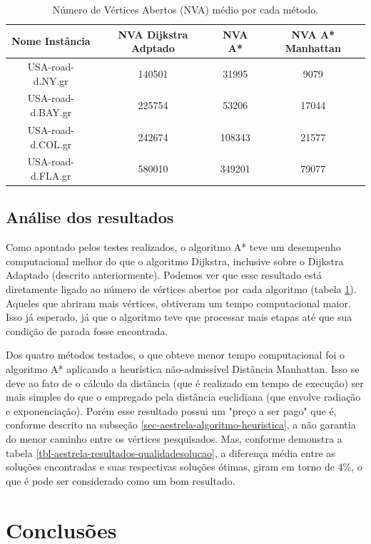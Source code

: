 \begin{table}[H]
\caption{Número de Vértices Abertos (NVA) médio por cada método.}
\label{tbl-aestrela-resultados-nva}
\centering
\begin{adjustbox}{max width=\textwidth}
\begin{tabular}{|c|c|c|c|}
\hline
\textbf{Nome Instância} & \textbf{NVA Dijkstra Adptado} & \textbf{NVA A*} & \textbf{NVA A* Manhattan} \\ \hline
USA-road-d.NY.gr        & 140501                        & 31995           & 9079                      \\ \hline
USA-road-d.BAY.gr       & 225754                        & 53206           & 17044                     \\ \hline
USA-road-d.COL.gr       & 242674                        & 108343          & 21577                     \\ \hline
USA-road-d.FLA.gr       & 580010                        & 349201          & 79077                     \\ \hline
\end{tabular} 
\end{adjustbox}
\end{table}

\subsection{Análise dos resultados}
\label{sec-aestrela-resultados-analise}
Como apontado pelos testes realizados, o algoritmo A* teve um desempenho computacional melhor do que o algoritmo Dijkstra, inclusive sobre o Dijkstra Adaptado (descrito anteriormente). Podemos ver que esse resultado está diretamente ligado ao número de vértices abertos por cada algoritmo (tabela \ref{tbl-aestrela-resultados-nva}). Aqueles que abriram mais vértices, obtiveram um tempo computacional maior. Isso já esperado, já que o algoritmo teve que processar mais etapas até que sua condição de parada fosse encontrada.

Dos quatro métodos testados, o que obteve menor tempo computacional foi o algoritmo A* aplicando a heurística não-admissível Distância Manhattan. Isso se deve ao fato de o cálculo da distância (que é realizado em tempo de execução) ser mais simples do que o empregado pela distância euclidiana (que envolve radiação e exponenciação). Porém esse resultado possui um "preço a ser pago" que é, conforme descrito na subseção \ref{sec-aestrela-algoritmo-heuristica}, a não garantia do menor caminho entre os vértices pesquisados. Mas, conforme demonstra a tabela \ref{tbl-aestrela-resultados-qualidadesolucao}, a diferença média entre as soluções encontradas e suas respectivas soluções ótimas, giram em torno de 4\%, o que é pode ser considerado como um bom resultado.

\section{Conclusões}
\label{sec-aestrela-conclusao}




